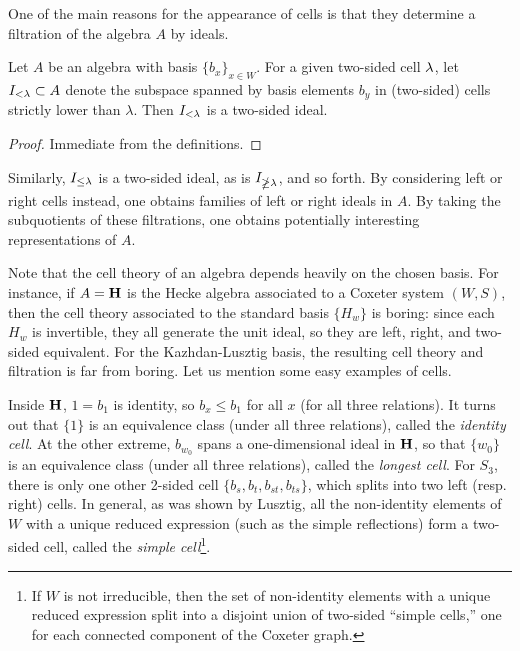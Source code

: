 One of the main reasons for the appearance of cells is that they determine a filtration of the algebra $A$ by ideals.

\begin{prop}\label{prop:cellFiltration}
Let $A$ be an algebra with basis $\{b_x\}_{x\in W}$.  For a given two-sided cell $\lambda$, let $I_{< \lambda}\subset A$ denote the subspace spanned by basis elements $b_y$ in (two-sided) cells strictly lower than $\lambda$.  Then $I_{< \lambda}$ is a two-sided ideal.
\end{prop}

\begin{proof}
Immediate from the definitions.
\end{proof}

Similarly, $I_{\le \lambda}$ is a two-sided ideal, as is $I_{\ngeq \lambda}$, and so forth. By considering left or right cells instead, one obtains families of left or right ideals in $A$. By
taking the subquotients of these filtrations, one obtains potentially interesting representations of $A$.

Note that the cell theory of an algebra depends heavily on the chosen basis. For instance, if $A={\mathbf H}$ is the Hecke algebra associated to a Coxeter system $(W,S)$, then the cell theory
associated to the standard basis $\{H_w\}$ is boring: since each $H_w$ is invertible, they all generate the unit ideal, so they are left, right, and two-sided equivalent. For the
Kazhdan-Lusztig basis, the resulting cell theory and filtration is far from boring. Let us mention some easy examples of cells.

\begin{ex} \label{ex:threecells} Inside ${\mathbf H}$, $1=b_1$ is identity, so $b_x \le b_1$ for all $x$ (for all three relations). It turns out that $\{1\}$ is an equivalence class (under all
three relations), called the \emph{identity cell}. At the other extreme, $b_{w_0}$ spans a one-dimensional ideal in ${\mathbf H}$, so that $\{w_0\}$ is an equivalence class (under all three
relations), called the \emph{longest cell}. For $S_3$, there is only one other 2-sided cell $\{b_s,b_t,b_{st},b_{ts}\}$, which splits into two left (resp. right) cells. In general, as
was shown by Lusztig, all the non-identity elements of $W$ with a unique reduced expression (such as the simple reflections) form a two-sided cell, called the \emph{simple cell}\footnote{If $W$ is not irreducible, then the set of non-identity elements with a unique reduced expression split into a disjoint union of two-sided ``simple cells,'' one for each connected component of the Coxeter graph.}. \end{ex}

